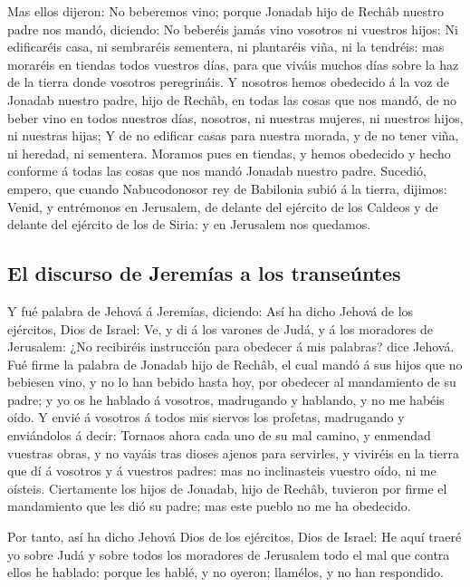  Mas ellos dijeron: No beberemos vino; porque Jonadab hijo
de Rechâb nuestro padre nos mandó, diciendo: No beberéis jamás vino
vosotros ni vuestros hijos:  Ni edificaréis casa, ni
sembraréis sementera, ni plantaréis viña, ni la tendréis: mas moraréis
en tiendas todos vuestros días, para que viváis muchos días sobre la haz
de la tierra donde vosotros peregrináis.  Y nosotros hemos
obedecido á la voz de Jonadab nuestro padre, hijo de Rechâb, en todas
las cosas que nos mandó, de no beber vino en todos nuestros días,
nosotros, ni nuestras mujeres, ni nuestros hijos, ni nuestras hijas;
 Y de no edificar casas para nuestra morada, y de no tener
viña, ni heredad, ni sementera.  Moramos pues en tiendas, y
hemos obedecido y hecho conforme á todas las cosas que nos mandó Jonadab
nuestro padre.  Sucedió, empero, que cuando Nabucodonosor
rey de Babilonia subió á la tierra, dijimos: Venid, y entrémonos en
Jerusalem, de delante del ejército de los Caldeos y de delante del
ejército de los de Siria: y en Jerusalem nos quedamos.

\hypertarget{el-discurso-de-jeremuxedas-a-los-transeuxfantes}{%
\subsection{El discurso de Jeremías a los
transeúntes}\label{el-discurso-de-jeremuxedas-a-los-transeuxfantes}}

 Y fué palabra de Jehová á Jeremías, diciendo:
 Así ha dicho Jehová de los ejércitos, Dios de Israel: Ve,
y di á los varones de Judá, y á los moradores de Jerusalem: ¿No
recibiréis instrucción para obedecer á mis palabras? dice Jehová.
 Fué firme la palabra de Jonadab hijo de Rechâb, el cual
mandó á sus hijos que no bebiesen vino, y no lo han bebido hasta hoy,
por obedecer al mandamiento de su padre; y yo os he hablado á vosotros,
madrugando y hablando, y no me habéis oído.  Y envié á
vosotros á todos mis siervos los profetas, madrugando y enviándolos á
decir: Tornaos ahora cada uno de su mal camino, y enmendad vuestras
obras, y no vayáis tras dioses ajenos para servirles, y viviréis en la
tierra que dí á vosotros y á vuestros padres: mas no inclinasteis
vuestro oído, ni me oísteis.  Ciertamente los hijos de
Jonadab, hijo de Rechâb, tuvieron por firme el mandamiento que les dió
su padre; mas este pueblo no me ha obedecido.

 Por tanto, así ha dicho Jehová Dios de los ejércitos, Dios
de Israel: He aquí traeré yo sobre Judá y sobre todos los moradores de
Jerusalem todo el mal que contra ellos he hablado: porque les hablé, y
no oyeron; llamélos, y no han respondido.

